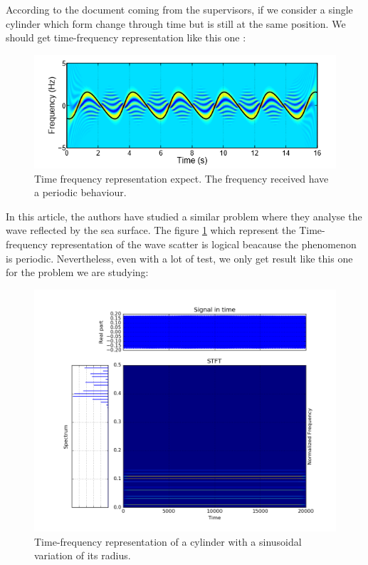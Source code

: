 According to the document coming from the supervisors, if we consider a single cylinder which form change through time but is still at the same position. We should get time-frequency representation like this one \cite{Analysis}:

\begin{figure}[H]
\centering
    \includegraphics[scale=0.6,angle=0]{Images/TFRExpected.png}
    \caption{Time frequency representation expect. The frequency received have a periodic behaviour.}
    \label{fig:TFRExpected}
\end{figure}

In this article, the authors have studied a similar problem where they analyse the wave reflected by the sea surface. The figure \ref{fig:TFRExpected} which represent the Time-frequency representation of the wave scatter is logical beacause the phenomenon is periodic. Nevertheless, even with a lot of test, we only get result like this one for the problem we are studying:

\begin{figure}[H]
\centering
    \includegraphics[scale=0.6,angle=0]{Images/Objx3y10.png}
    \caption{Time-frequency representation of a cylinder with a sinusoidal variation of its radius.}
    \label{fig:Objx3y10}
\end{figure}

